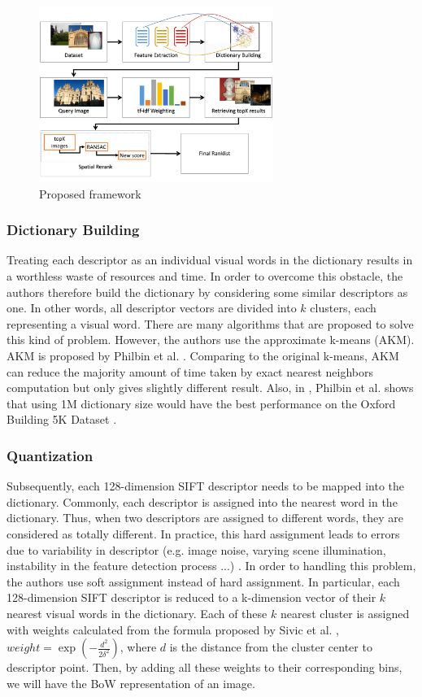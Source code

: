 \begin{figure}
    \centering
    \includegraphics[width=3.0in]{process.pdf}
    \caption{Proposed framework}
    \label{fig:proposed_framework}
\end{figure}

\subsubsection{Dictionary Building} \label{section:dictionary_building}
Treating each descriptor as an individual visual words in the dictionary results in a worthless waste of resources and time. In order to overcome this obstacle, the authors therefore build the dictionary by considering some similar descriptors as one. In other words, all descriptor vectors are divided into $k$ clusters, each representing a visual word. There are many algorithms that are proposed to solve this kind of problem. However, the authors use the approximate k-means (AKM). AKM is proposed by Philbin et al. \cite{2}. Comparing to the original k-means, AKM can reduce the majority amount of time taken by exact nearest neighbors computation but only gives slightly different result. Also, in \cite{2}, Philbin et al. shows that using 1M dictionary size would have the best performance on the Oxford Building 5K Dataset \cite{oxbuilding}.

\subsubsection{Quantization} \label{section:quantization}

Subsequently, each 128-dimension SIFT descriptor needs to be mapped into the dictionary. Commonly, each descriptor is assigned into the nearest word in the dictionary. Thus, when two descriptors are assigned to different words, they are considered as totally different. In practice, this hard assignment leads to errors due to variability in descriptor (e.g. image noise, varying scene illumination, instability in the feature detection process ...) \cite{7}. In order to handling this problem, the authors use soft assignment instead of hard assignment. In particular, each 128-dimension SIFT descriptor is reduced to a k-dimension vector of their $k$ nearest visual words in the dictionary. Each of these $k$ nearest cluster is assigned with weights calculated from the formula proposed by Sivic et al. \cite{7}, $weight = \exp(-\frac{d^2}{2\delta^2})$, where $d$ is the distance from the cluster center to descriptor point. Then, by adding all these weights to their corresponding bins, we will have the BoW representation of an image.

